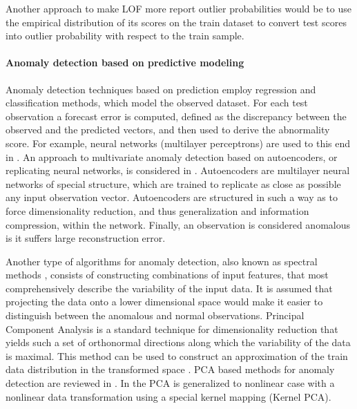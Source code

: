 \documentclass[a4paper,14pt]{extarticle}
\begin{document}
Another approach to make LOF more report outlier probabilities would be to use the
empirical distribution of its scores on the train dataset to convert test scores
into outlier probability with respect to the train sample.


\paragraph{Anomaly detection based on predictive modeling} %
\label{par:anomaly_detection_based_on_predictive_modeling}

Anomaly detection techniques based on prediction employ regression and classification
methods, which model the observed dataset. For each test observation a forecast error
is computed, defined as the discrepancy between the observed and the predicted vectors,
and then used to derive the abnormality score. For example, neural networks (multilayer
perceptrons) are used to this end in \cite{augusteijn2002}. An approach to multivariate
anomaly detection based on autoencoders, or replicating neural networks, is considered
in \cite{hawkins2002,williams2002}. Autoencoders are multilayer neural networks of
special structure, which are trained to replicate as close as possible any input
observation vector. Autoencoders are structured in such a way as to force dimensionality
reduction, and thus generalization and information compression, within the network.
Finally, an observation is considered anomalous is it suffers large reconstruction
error.

Another type of algorithms for anomaly detection, also known as spectral methods
\cite{chandola2009}, consists of constructing combinations of input features, that
most comprehensively describe the variability of the input data. It is assumed that
projecting the data onto a lower dimensional space would make it easier to distinguish
between the anomalous and normal observations. Principal Component Analysis is a
standard technique for dimensionality reduction that yields such a set of orthonormal
directions along which the variability of the data is maximal. This method can be
used to construct an approximation of the train data distribution in the transformed
space \cite{jolliffe2014}. PCA based methods for anomaly detection are reviewed in
\cite{dutta2007,shyu2003}. In \cite{hoffmann2007,scholkopf1998} the PCA is generalized
to nonlinear case with a nonlinear data transformation using a special kernel mapping
(Kernel PCA).
\end{document}
